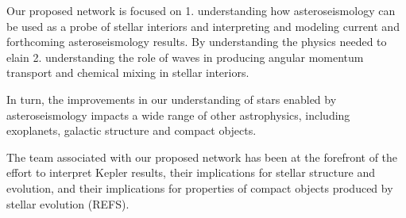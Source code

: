 Our proposed network is focused on 1.  understanding how asteroseismology can be used as a probe of stellar interiors and interpreting and modeling current and forthcoming asteroseismology results.  By understanding the physics needed to elain 
2.  understanding the role of waves in producing angular momentum transport and chemical mixing in stellar interiors.    

In turn, the improvements in our understanding of stars enabled by asteroseismology impacts a wide range of other astrophysics, including exoplanets, galactic structure and compact objects.   


The team associated with our proposed network has been at the forefront of the effort to interpret Kepler results, their implications for stellar structure and evolution, and their implications for properties of compact objects produced by stellar evolution (REFS).   
